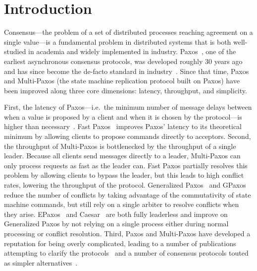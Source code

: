 \section{Introduction}
Consensus---the problem of a set of distributed processes reaching agreement on
a single value---is a fundamental problem in distributed systems that is both
well-studied in academia and widely implemented in industry.
Paxos~\cite{lamport1998part}, one of the earliest asynchronous consensus
protocols, was developed roughly 30 years ago and has since become the de-facto
standard in industry~\cite{burrows2006chubby, chandra2007paxos,
baker2011megastore, corbett2013spanner}. Since that time, Paxos and Multi-Paxos
(the state machine replication protocol built on Paxos) have been improved
along three core dimensions: latency, throughput, and simplicity.

First, the latency of Paxos---i.e.\ the minimum number of message delays
between when a value is proposed by a client and when it is chosen by the
protocol---is higher than necessary~\cite{lamport2006lower}. Fast
Paxos~\cite{lamport2006fast} improves Paxos' latency to its theoretical minimum
by allowing clients to propose commands directly to acceptors.
%
Second, the throughput of Multi-Paxos is bottlenecked by the throughput of a
single leader. Because all clients send messages directly to a leader,
Multi-Paxos can only process requests as fast as the leader can. Fast Paxos
partially resolves this problem by allowing clients to bypass the leader, but
this leads to high conflict rates, lowering the throughput of the protocol.
Generalized Paxos~\cite{lamport2005generalized} and GPaxos~\cite{sutra2011fast}
reduce the number of conflicts by taking advantage of the commutativity of
state machine commands, but still rely on a single arbiter to resolve conflicts
when they arise. EPaxos~\cite{moraru2013there, moraru2013proof} and
Caesar~\cite{arun2017speeding} are both fully leaderless and improve on
Generalized Paxos by not relying on a single process either during normal
processing or conflict resolution.
%
Third, Paxos and Multi-Paxos have developed a reputation for being overly
complicated, leading to a number of publications attempting to clarify the
protocols~\cite{lamport2001paxos, lampson2001abcd, mazieres2007paxos,
van2015paxos} and a number of consensus protocols touted as simpler
alternatives~\cite{ongaro2014search, rystsov2018caspaxos}.

